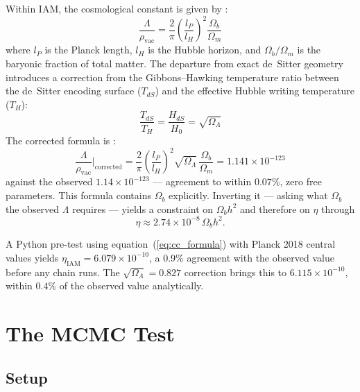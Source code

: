 \documentclass[12pt,a4paper]{article}
\begin{document}
Within IAM, the cosmological constant is given by
\citep{mahaffey2026_cc}:
\begin{equation}
\frac{\Lambda}{\rho_\mathrm{vac}} =
\frac{2}{\pi}
\left(\frac{l_P}{l_H}\right)^2
\frac{\Omega_b}{\Omega_m}
\label{eq:cc_formula}
\end{equation}
where $l_P$ is the Planck length, $l_H$ is the Hubble horizon, and
$\Omega_b/\Omega_m$ is the baryonic fraction of total matter.
The departure from exact de~Sitter geometry introduces a correction
from the Gibbons--Hawking temperature ratio between the de~Sitter
encoding surface ($T_{dS}$) and the effective Hubble writing
temperature ($T_H$):
\begin{equation}
\frac{T_{dS}}{T_H} = \frac{H_{dS}}{H_0} = \sqrt{\Omega_\Lambda}
\label{eq:temp_ratio}
\end{equation}
The corrected formula is \citep{mahaffey2026_cc}:
\begin{equation}
\frac{\Lambda}{\rho_\mathrm{vac}}\bigg|_\mathrm{corrected} =
\frac{2}{\pi}
\left(\frac{l_P}{l_H}\right)^2
\sqrt{\Omega_\Lambda}
\,\frac{\Omega_b}{\Omega_m}
= 1.141 \times 10^{-123}
\label{eq:cc_corrected}
\end{equation}
against the observed $1.14 \times 10^{-123}$ — agreement to within
$0.07\%$, zero free parameters. This formula contains $\Omega_b$
explicitly. Inverting it — asking what $\Omega_b$ the observed
$\Lambda$ requires — yields a constraint on $\Omega_b h^2$ and
therefore on $\eta$ through
\begin{equation}
\eta \approx 2.74 \times 10^{-8} \, \Omega_b h^2.
\label{eq:eta_omegab}
\end{equation}

A Python pre-test using equation~(\ref{eq:cc_formula}) with Planck
2018 central values yields $\eta_\mathrm{IAM} = 6.079 \times
10^{-10}$, a 0.9\% agreement with the observed value before any
chain runs. The $\sqrt{\Omega_\Lambda} = 0.827$ correction
\citep{mahaffey2026_cc} brings this to $6.115 \times 10^{-10}$,
within $0.4\%$ of the observed value analytically.

\section{The MCMC Test}
\label{sec:mcmc}

\subsection{Setup}
\end{document}
